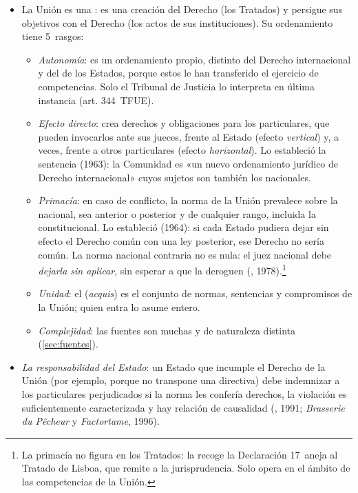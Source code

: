 \documentclass[11pt]{article}
\begin{document}
\begin{itemize}
\item La Unión es una : es una creación del Derecho (los Tratados) y persigue sus objetivos con el Derecho (los actos de sus instituciones)\nocite{Borchardt2017ABC}. Su ordenamiento tiene 5~rasgos:
  \begin{itemize}
  \item \emph{Autonomía}: es un ordenamiento propio, distinto del Derecho internacional y del de los Estados, porque estos le han transferido el ejercicio de competencias. Solo el Tribunal de Justicia lo interpreta en última instancia (art. 344~TFUE).
  \item \emph{Efecto directo}: crea derechos y obligaciones para los particulares, que pueden invocarlos ante sus jueces, frente al Estado (efecto \emph{vertical}) y, a veces, frente a otros particulares (efecto \emph{horizontal}). Lo estableció la sentencia  (1963): la Comunidad es «un nuevo ordenamiento jurídico de Derecho internacional» cuyos sujetos son también los nacionales.
  \item \emph{Primacía}: en caso de conflicto, la norma de la Unión prevalece sobre la nacional, sea anterior o posterior y de cualquier rango, incluida la constitucional. Lo estableció  (1964): si cada Estado pudiera dejar sin efecto el Derecho común con una ley posterior, ese Derecho no sería común. La norma nacional contraria no es nula: el juez nacional debe \emph{dejarla sin aplicar}, sin esperar a que la deroguen (, 1978).\footnote{La primacía no figura en los Tratados: la recoge la Declaración 17~aneja al Tratado de Lisboa, que remite a la jurisprudencia. Solo opera en el ámbito de las competencias de la Unión.}
  \item \emph{Unidad}: el  (\emph{acquis}) es el conjunto de normas, sentencias y compromisos de la Unión; quien entra lo asume entero.
  \item \emph{Complejidad}: las fuentes son muchas y de naturaleza distinta (\ref{sec:fuentes}).
  \end{itemize}
\item \emph{La responsabilidad del Estado}: un Estado que incumple el Derecho de la Unión (por ejemplo, porque no transpone una directiva) debe indemnizar a los particulares perjudicados si la norma les confería derechos, la violación es suficientemente caracterizada y hay relación de causalidad (, 1991; \emph{Brasserie du Pêcheur} y \emph{Factortame}, 1996).
\end{itemize}
\end{document}
